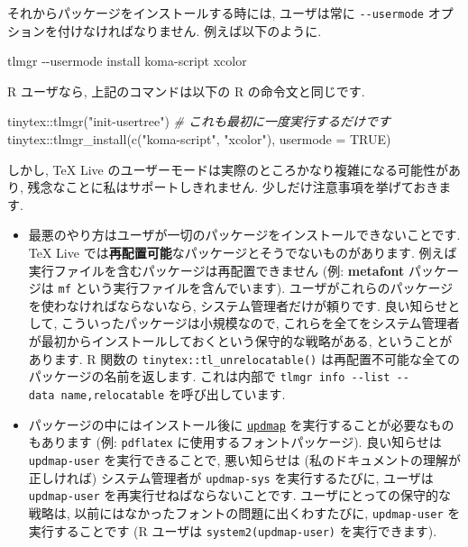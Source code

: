 \documentclass[
  xelatex,ja=standard,jafont=noto]{bxjsreport}
\newenvironment{Shaded}{\begin{snugshade}}{\end{snugshade}}
\newcommand{\AttributeTok}[1]{\textcolor[rgb]{0.77,0.63,0.00}{#1}}
\newcommand{\CommentTok}[1]{\textcolor[rgb]{0.56,0.35,0.01}{\textit{#1}}}
\newcommand{\ConstantTok}[1]{\textcolor[rgb]{0.00,0.00,0.00}{#1}}
\newcommand{\ExtensionTok}[1]{#1}
\newcommand{\FunctionTok}[1]{\textcolor[rgb]{0.00,0.00,0.00}{#1}}
\newcommand{\NormalTok}[1]{#1}
\newcommand{\SpecialCharTok}[1]{\textcolor[rgb]{0.00,0.00,0.00}{#1}}
\newcommand{\StringTok}[1]{\textcolor[rgb]{0.31,0.60,0.02}{#1}}
\begin{document}
それからパッケージをインストールする時には, ユーザは常に
\texttt{-\/-usermode} オプションを付けなければなりません.
例えば以下のように.

\begin{Shaded}
\begin{Highlighting}[]
\ExtensionTok{tlmgr} \AttributeTok{{-}{-}usermode}\NormalTok{ install koma{-}script xcolor}
\end{Highlighting}
\end{Shaded}

R ユーザなら, 上記のコマンドは以下の R の命令文と同じです.

\begin{Shaded}
\begin{Highlighting}[numbers=left,,]
\NormalTok{tinytex}\SpecialCharTok{::}\FunctionTok{tlmgr}\NormalTok{(}\StringTok{"init{-}usertree"}\NormalTok{) }\CommentTok{\# これも最初に一度実行するだけです}
\NormalTok{tinytex}\SpecialCharTok{::}\FunctionTok{tlmgr\_install}\NormalTok{(}\FunctionTok{c}\NormalTok{(}\StringTok{"koma{-}script"}\NormalTok{, }\StringTok{"xcolor"}\NormalTok{), }\AttributeTok{usermode =} \ConstantTok{TRUE}\NormalTok{)}
\end{Highlighting}
\end{Shaded}

しかし, TeX Live
のユーザーモードは実際のところかなり複雑になる可能性があり,
残念なことに私はサポートしきれません. 少しだけ注意事項を挙げておきます.

\begin{itemize}
\item
  最悪のやり方はユーザが一切のパッケージをインストールできないことです.
  TeX Live
  では\textbf{再配置可能}なパッケージとそうでないものがあります.
  例えば実行ファイルを含むパッケージは再配置できません (例:
  \textbf{metafont} パッケージは \texttt{mf}
  という実行ファイルを含んでいます).
  ユーザがこれらのパッケージを使わなければならないなら,
  システム管理者だけが頼りです. 良い知らせとして,
  こういったパッケージは小規模なので,
  これらを全てをシステム管理者が最初からインストールしておくという保守的な戦略がある,
  ということがあります. R 関数の \texttt{tinytex::tl\_unrelocatable()}
  は再配置不可能な全てのパッケージの名前を返します. これは内部で
  \texttt{tlmgr\ info\ -\/-list\ -\/-data\ name,relocatable}
  を呼び出しています.
\item
  パッケージの中にはインストール後に
  \href{https://www.tug.org/texlive/doc/updmap.html}{\texttt{updmap}}
  を実行することが必要なものもあります (例: \texttt{pdflatex}
  に使用するフォントパッケージ). 良い知らせは \texttt{updmap-user}
  を実行できることで, 悪い知らせは (私のドキュメントの理解が正しければ)
  システム管理者が \texttt{updmap-sys} を実行するたびに, ユーザは
  \texttt{updmap-user} を再実行せねばならないことです.
  ユーザにとっての保守的な戦略は,
  以前にはなかったフォントの問題に出くわすたびに, \texttt{updmap-user}
  を実行することです (R ユーザは
  \texttt{system2(\textquotesingle{}updmap-user\textquotesingle{})}
  を実行できます).
\end{itemize}
\end{document}
